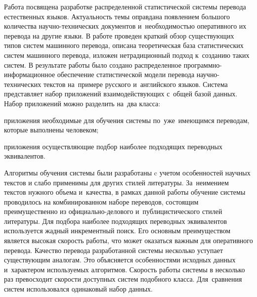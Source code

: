 	Работа посвящена разработке распределенной статистической системы 
	перевода естественных языков.
	Актуальность темы оправдана появлением большого количества научно-технических 
	документов и~необходимостью оперативного их перевода на другие языки. 
	В работе проведен краткий обзор существующих типов систем машинного перевода,
	описана теоретическая база статистических систем машинного перевода, 
	изложен нетрадиционный подход к~созданию таких систем. 
	В результате работы было создано распределенное 
	программно-информационное обеспечение
	статистической модели перевода научно-технических текстов 
	на~примере русского и~английского языков.
	Система представляет набор приложений 
	взаимодействующих с~общей базой данных.
	Набор приложений можно разделить на~два класса:
	\begin{ditemize}
		\item приложения необходимые для обучения системы по~уже~имеющимся
		переводам, которые выполнены человеком;
		\item приложения осуществляющие подбор наиболее 
		подходящих переводных эквивалентов.
	\end{ditemize}
	Алгоритмы обучения системы были разработаны c учетом 
	особенностей научных текстов
	и слабо применимы для других стилей литературы.
	За~неимением текстов нужного объема и~качества,
	в рамках данной работы обучение системы проводилось
	на комбинированном наборе переводов, состоящим 
	преимущественно
	из официально-делового и~публицистического стилей литературы.
	Для подбора наиболее подходящих переводных эквивалентов
	используется жадный инкрементный поиск.
	Его основным преимуществом является высокая скорость работы,
	что может оказаться важным для оперативного перевода.
	Качество перевода разработанной системы несколько уступает
	существующим аналогам. Это объясняется особенностями
	исходных данных и~характером используемых алгоритмов.
	Скорость работы системы в несколько раз превосходит 
	скорости доступных систем подобного 
	класса. Для~сравнения систем использовался 
	одинаковый набор данных.


\pagebreak

